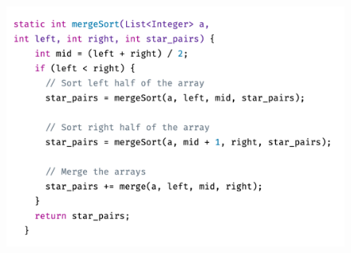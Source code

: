 \documentclass[11pt]{article}
\begin{document}
\begin{figure}
\begin{minipage}{.5\textwidth}
\end{minipage}%
\begin{minipage}{.5\textwidth}
  \centering
  \includegraphics[width=1.2\linewidth]{mergeSort.png}
\end{minipage}
\noindent
\begin{minipage}[t]{.49\textwidth}
  \centering
  \label{fig:test1}
\end{minipage}%
\hfill
\begin{minipage}[t]{.49\textwidth}
  \centering
  \label{fig:test2}
\end{minipage}
\end{figure}
\end{document}
